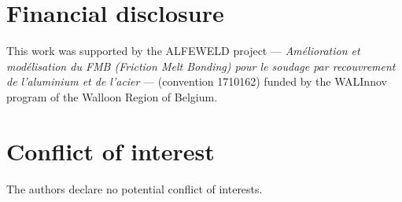 \documentclass[final,3p,times]{elsarticle}
\begin{document}
\section*{Financial disclosure}
This work was supported by the ALFEWELD project --- \textit{Amélioration et modélisation du FMB (Friction Melt Bonding) pour le soudage par recouvrement de l’aluminium et de l’acier} --- (convention 1710162) funded by the WALInnov program of the Walloon Region of Belgium.

\section*{Conflict of interest}
The authors declare no potential conflict of interests.




 






\end{document}
